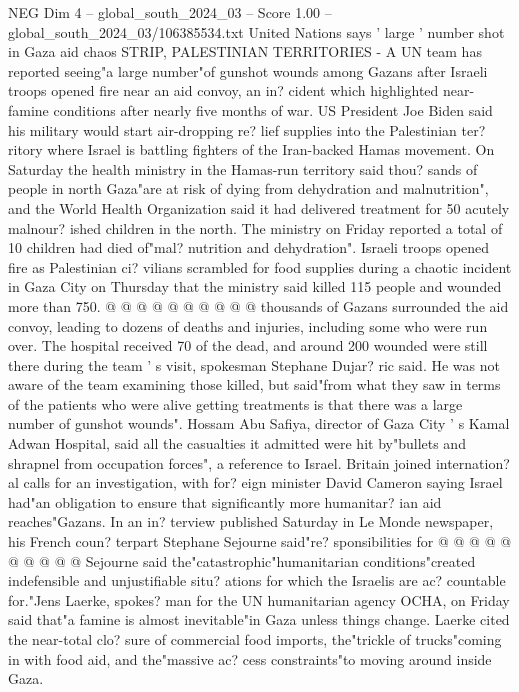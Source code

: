 \begin{textsample}{NEG Dim 4 – global\_south\_2024\_03 – Score 1.00 – global\_south\_2024\_03/106385534.txt}  \label{ex:f4_neg_354}
United Nations says ' large ' number shot in Gaza aid chaos STRIP, PALESTINIAN TERRITORIES - A UN team has reported seeing"a large number"of gunshot wounds among Gazans after Israeli troops opened fire near an aid convoy, an in? cident which highlighted near-famine conditions after nearly five months of war.
US President Joe Biden said his military would start air-dropping re? lief supplies into the Palestinian ter? ritory where Israel is battling fighters of the Iran-backed Hamas movement.
On Saturday the health ministry in the Hamas-run territory said thou? sands of people in north Gaza"are at risk of dying from dehydration and malnutrition", and the World Health Organization said it had delivered treatment for 50 acutely malnour? ished children in the north.
The ministry on Friday reported a total of 10 children had died of"mal? nutrition and dehydration".
Israeli troops opened fire as Palestinian ci? vilians scrambled for food supplies during a chaotic incident in Gaza City on Thursday that the ministry said killed 115 people and wounded more than 750. @ @ @ @ @ @ @ @ @ @ thousands of Gazans surrounded the aid convoy, leading to dozens of deaths and injuries, including some who were run over.
The hospital received 70 of the dead, and around 200 wounded were still there during the team ' s visit, spokesman Stephane Dujar? ric said.
He was not aware of the team examining those killed, but said"from what they saw in terms of the patients who were alive getting treatments is that there was a large number of gunshot wounds".
Hossam Abu Safiya, director of Gaza City ' s Kamal Adwan Hospital, said all the casualties it admitted were hit by"bullets and shrapnel from occupation forces", a reference to Israel.
Britain joined internation? al calls for an investigation, with for? eign minister David Cameron saying Israel had"an obligation to ensure that significantly more humanitar? ian aid reaches"Gazans.
In an in? terview published Saturday in Le Monde newspaper, his French coun? terpart Stephane Sejourne said"re? sponsibilities for @ @ @ @ @ @ @ @ @ @ Sejourne said the"catastrophic"humanitarian conditions"created indefensible and unjustifiable situ? ations for which the Israelis are ac? countable for."Jens Laerke, spokes? man for the UN humanitarian agency OCHA, on Friday said that"a famine is almost inevitable"in Gaza unless things change.
Laerke cited the near-total clo? sure of commercial food imports, the"trickle of trucks"coming in with food aid, and the"massive ac? cess constraints"to moving around inside Gaza.

\end{textsample}
